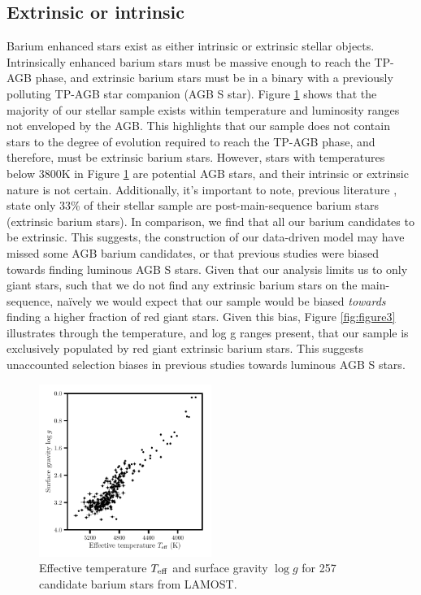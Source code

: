 \documentclass[a4paper,fleqn,usenatbib]{mnras}
\begin{document}
\subsection{Extrinsic or intrinsic}
Barium enhanced stars exist as either intrinsic or extrinsic stellar objects. Intrinsically enhanced barium stars must be massive enough to reach the TP-AGB phase, and extrinsic barium stars must be in a binary with a previously polluting TP-AGB star companion (AGB S star). Figure \ref{fig:figure2} shows that the majority of our stellar sample exists within temperature and luminosity ranges not enveloped by the AGB. This highlights that our sample does not contain stars to the degree of evolution required to reach the TP-AGB phase, and therefore, must be extrinsic barium stars. However, stars with temperatures below 3800K in Figure \ref{fig:figure2} are potential AGB stars, and their intrinsic or extrinsic nature is not certain. Additionally, it's important to note, previous literature \citep{van2017}, state only 33\% of their stellar sample are post-main-sequence barium stars (extrinsic barium stars). In comparison, we find that all our barium candidates to be extrinsic. This suggests, the construction of our data-driven model may have missed some AGB barium candidates, or that previous studies were biased towards finding luminous AGB S stars. Given that our analysis limits us to only giant stars, such that we do not find any extrinsic barium stars on the main-sequence, na\"ively we would expect that our sample would be biased \emph{towards} finding a higher fraction of red giant stars. Given this bias, Figure \ref{fig:figure3} illustrates through the temperature, and log g ranges present, that our sample is exclusively populated by red giant extrinsic barium stars. This suggests unaccounted selection biases in previous studies towards luminous AGB S stars.

\begin{figure}
	\includegraphics[width=0.5\textwidth]{hrd_new.pdf}
    \caption{Effective temperature $T_{\rm eff}$ and surface gravity $\log{g}$ for 257 candidate barium stars from LAMOST.}
    \label{fig:figure2}
\end{figure}
\end{document}
